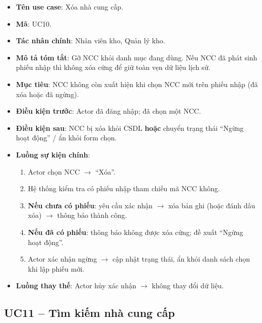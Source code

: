 \begin{itemize}[leftmargin=1.5cm]
    \item \textbf{Tên use case}: Xóa nhà cung cấp.
    \item \textbf{Mã}: UC10.
    \item \textbf{Tác nhân chính}: Nhân viên kho, Quản lý kho.
    \item \textbf{Mô tả tóm tắt}: Gỡ NCC khỏi danh mục đang dùng. Nếu NCC đã phát sinh phiếu nhập thì không xóa cứng để giữ toàn vẹn dữ liệu lịch sử.
    \item \textbf{Mục tiêu}: NCC không còn xuất hiện khi chọn NCC mới trên phiếu nhập (đã xóa hoặc đã ngừng).
    \item \textbf{Điều kiện trước}: Actor đã đăng nhập; đã chọn một NCC.
    \item \textbf{Điều kiện sau}: NCC bị xóa khỏi CSDL \textbf{hoặc} chuyển trạng thái ``Ngừng hoạt động'' / ẩn khỏi form chọn.
    \item \textbf{Luồng sự kiện chính}:
    \begin{enumerate}
        \item Actor chọn NCC $\rightarrow$ ``Xóa''.
        \item Hệ thống kiểm tra có phiếu nhập tham chiếu mã NCC không.
        \item \textbf{Nếu chưa có phiếu}: yêu cầu xác nhận $\rightarrow$ xóa bản ghi (hoặc đánh dấu xóa) $\rightarrow$ thông báo thành công.
        \item \textbf{Nếu đã có phiếu}: thông báo không được xóa cứng; đề xuất ``Ngừng hoạt động''.
        \item Actor xác nhận ngừng $\rightarrow$ cập nhật trạng thái, ẩn khỏi danh sách chọn khi lập phiếu mới.
    \end{enumerate}
    \item \textbf{Luồng thay thế}: Actor hủy xác nhận $\rightarrow$ không thay đổi dữ liệu.
\end{itemize}

\subsection{UC11 -- Tìm kiếm nhà cung cấp}


